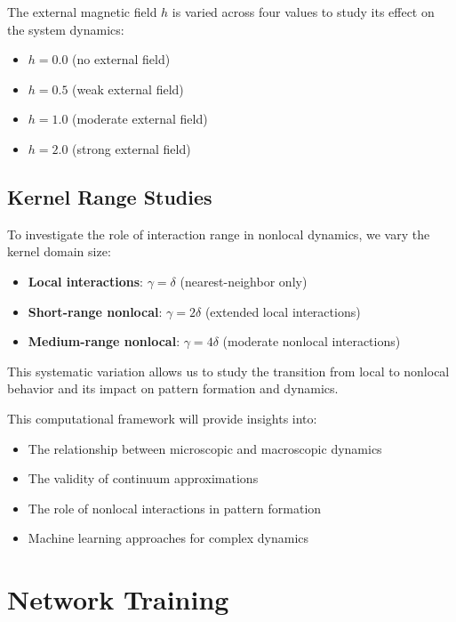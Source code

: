 \documentclass[11pt,a4paper]{article}
\begin{document}
The external magnetic field $h$ is varied across four values to study its effect on the system dynamics:

\begin{itemize}
    \item $h = 0.0$ (no external field)
    \item $h = 0.5$ (weak external field)
    \item $h = 1.0$ (moderate external field)
    \item $h = 2.0$ (strong external field)
\end{itemize}

\subsection{Kernel Range Studies}

To investigate the role of interaction range in nonlocal dynamics, we vary the kernel domain size:

\begin{itemize}
    \item \textbf{Local interactions}: $\gamma = \delta$ (nearest-neighbor only)
    \item \textbf{Short-range nonlocal}: $\gamma = 2\delta$ (extended local interactions)
    \item \textbf{Medium-range nonlocal}: $\gamma = 4\delta$ (moderate nonlocal interactions)
\end{itemize}

This systematic variation allows us to study the transition from local to nonlocal behavior and its impact on pattern formation and dynamics.

This computational framework will provide insights into:

\begin{itemize}
    \item The relationship between microscopic and macroscopic dynamics
    \item The validity of continuum approximations
    \item The role of nonlocal interactions in pattern formation
    \item Machine learning approaches for complex dynamics
\end{itemize}

\section{Network Training}
\end{document}
